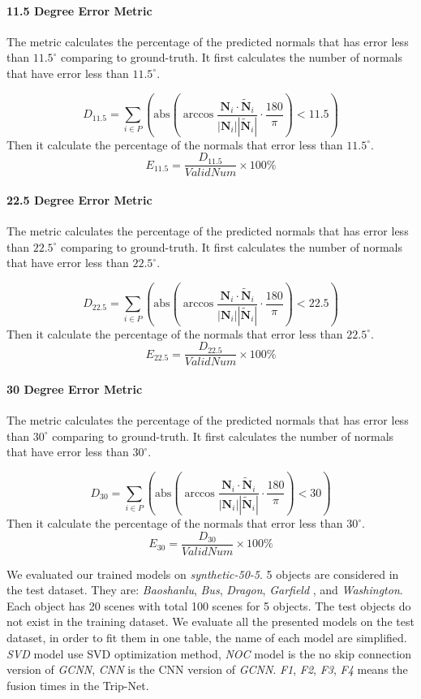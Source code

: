 \paragraph{11.5 Degree Error Metric}
The metric calculates the percentage of the predicted normals that has error less than $ 11.5^\circ $ comparing to ground-truth. It first calculates the number of normals that have error less than $ 11.5^\circ $.

\[
D_{11.5} = \sum_{i\in P} \left( \text{abs}\left(   \arccos \frac{\textbf{N}_{i}\cdot \tilde{\textbf{N}}_{i}} {| \textbf{N}_{i} |  |\tilde{\textbf{N}}_{i}|  } \cdot  \frac{180}{\pi}   \right) < 11.5 \right)
\]
Then it calculate the percentage of the normals that error less than $ 11.5^\circ $.
\[ 
E_{11.5} = \frac{D_{11.5}}{ValidNum}\times 100\%
\]

\paragraph{22.5 Degree Error Metric}
The metric calculates the percentage of the predicted normals that has error less than $ 22.5^\circ $ comparing to ground-truth. It first calculates the number of normals that have error less than $ 22.5^\circ $.

\[
D_{22.5} = \sum_{i\in P} \left( \text{abs}\left(   \arccos \frac{\textbf{N}_{i}\cdot \tilde{\textbf{N}}_{i}} {| \textbf{N}_{i} |  |\tilde{\textbf{N}}_{i}|  } \cdot  \frac{180}{\pi}   \right) < 22.5 \right)
\]
Then it calculate the percentage of the normals that error less than $ 22.5^\circ $.
\[ 
E_{22.5} = \frac{D_{22.5}}{ValidNum}\times 100\%
\]


\paragraph{30 Degree Error Metric}
The metric calculates the percentage of the predicted normals that has error less than $ 30^\circ $ comparing to ground-truth. It first calculates the number of normals that have error less than $ 30^\circ $.

\[
D_{30} = \sum_{i\in P} \left( \text{abs}\left(   \arccos \frac{\textbf{N}_{i}\cdot \tilde{\textbf{N}}_{i}} {| \textbf{N}_{i} |  |\tilde{\textbf{N}}_{i}|  } \cdot  \frac{180}{\pi}   \right) < 30 \right)
\]
Then it calculate the percentage of the normals that error less than $ 30^\circ $.
\[ 
E_{30} = \frac{D_{30}}{ValidNum}\times 100\%
\]

We evaluated our trained models on \textit{synthetic-50-5}. 5 objects are considered in the test dataset. They are: \textit{Baoshanlu}, \textit{Bus},  \textit{Dragon}, \textit{Garfield} , and \textit{Washington}. Each object has 20 scenes with total 100 scenes for 5 objects. The test objects do not exist in the training dataset. We evaluate all the presented models on the test dataset, in order to fit them in one table, the name of each model are simplified. \textit{SVD}  model use SVD optimization method, \textit{NOC} model is the no skip connection version of \textit{GCNN}, \textit{CNN} is the CNN version of \textit{GCNN}. \textit{F1}, \textit{F2}, \textit{F3}, \textit{F4} means the fusion times in the Trip-Net. 

